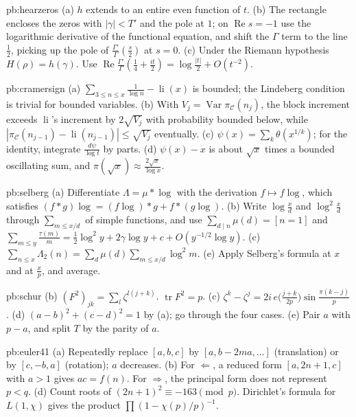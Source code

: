 \begin{hint}{pb:hearzeros}
(a) $h$ extends to an entire even function of $t$. (b) The rectangle encloses the zeros with $|\gamma|<T'$ and the pole at $1$; on $\operatorname{Re}s=-1$ use the
logarithmic derivative of the functional equation, and shift the $\Gamma$ term to the line $\frac12$, picking up the pole of $\frac{\Gamma'}\Gamma(\frac s2)$ at $s=0$. (c) Under the
Riemann hypothesis $H(\rho)=h(\gamma)$. Use $\operatorname{Re}\frac{\Gamma'}\Gamma(\frac14+\frac{it}2)=\log\frac{|t|}2+O(t^{-2})$.
\end{hint}

\begin{hint}{pb:cramersign}
(a) $\sum_{3\le n\le x}\frac1{\log n}-\operatorname{li}(x)$ is bounded; the Lindeberg condition is trivial for bounded variables. (b) With $V_j=\operatorname{Var}\pi_{\mathcal C}(n_j)$, the
block increment exceeds $\operatorname{li}$'s increment by $2\sqrt{V_j}$ with probability bounded below, while $|\pi_{\mathcal C}(n_{j-1})-\operatorname{li}(n_{j-1})|\le\sqrt{V_j}$
eventually. (c) $\psi(x)=\sum_k\theta(x^{1/k})$; for the identity, integrate $\frac{d\psi}{\log t}$ by parts. (d) $\psi(x)-x$ is about $\sqrt x$ times a bounded
oscillating sum, and $\pi(\sqrt x)\approx\frac{2\sqrt x}{\log x}$.
\end{hint}

\begin{hint}{pb:selberg}
(a) Differentiate $\Lambda=\mu*\log$ with the derivation $f\mapsto f\log$, which satisfies $(f*g)\log=(f\log)*g+f*(g\log)$. (b) Write $\log\frac xd$ and $\log^2\frac xd$ through
$\sum_{m\le x/d}$ of simple functions, and use $\sum_{d\mid n}\mu(d)=[n=1]$ and $\sum_{m\le y}\frac{\tau(m)}m=\frac12\log^2y+2\gamma\log y+c+O(y^{-1/2}\log y)$. (c) $\sum_{n\le x}\Lambda_2(n)=\sum_d\mu(d)\sum_{m\le x/d}\log^2m$.
(e) Apply Selberg's formula at $x$ and at $\frac xp$, and average.
\end{hint}

\begin{hint}{pb:schur}
(b) $(F^2)_{jk}=\sum_l\zeta^{l(j+k)}$. $\operatorname{tr}F^2=p$. (c) $\zeta^k-\zeta^j=2i\,e\bigl(\frac{j+k}{2p}\bigr)\sin\frac{\pi(k-j)}p$. (d) $(a-b)^2+(c-d)^2=1$ by (a); go through the
four cases. (e) Pair $a$ with $p-a$, and split $T$ by the parity of $a$.
\end{hint}

\begin{hint}{pb:euler41}
(a) Repeatedly replace $[a,b,c]$ by $[a,b-2ma,\dots]$ (translation) or by $[c,-b,a]$ (rotation); $a$ decreases. (b) For $\Leftarrow$, a reduced form $[a,2n+1,c]$ with $a>1$ gives
$ac=f(n)$. For $\Rightarrow$, the principal form does not represent $p<q$. (d) Count roots of $(2n+1)^2\equiv-163\pmod p$. Dirichlet's formula for $L(1,\chi)$ gives the
product $\prod(1-\chi(p)/p)^{-1}$.
\end{hint}

